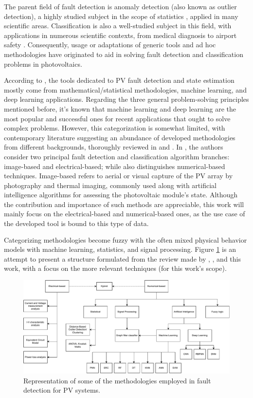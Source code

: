 The parent field of fault detection is anomaly detection (also known as outlier detection), a highly studied subject in the scope of statistics \cite{Prasad2009}, applied in many scientific areas. Classification is also a well-studied subject in this field, with applications in numerous scientific contexts, from medical diagnosis to airport safety \cite{classification}. Consequently, usage or adaptations of generic tools and ad hoc methodologies have originated to aid in solving fault detection and classification problems in photovoltaics.

According to \cite{AIPV}, the tools dedicated to PV fault detection and state estimation mostly come from mathematical/statistical methodologies, machine learning, and deep learning applications. Regarding the three general problem-solving principles mentioned before, it's known that machine learning and deep learning are the most popular and successful ones for recent applications that ought to solve complex problems. However, this categorization is somewhat limited, with contemporary literature suggesting an abundance of developed methodologies from different backgrounds, thoroughly reviewed in \cite{Hong2022} and \cite{Livera2019}. In \cite{Hong2022}, the authors consider two principal fault detection and classification algorithm branches: image-based and electrical-based; while \cite{Livera2019} also distinguishes numerical-based techniques. Image-based refers to aerial or visual capture of the PV array by photography and thermal imaging, commonly used along with artificial intelligence algorithms for assessing the photovoltaic module's state. Although the contribution and importance of such methods are appreciable, this work will mainly focus on the electrical-based and numerical-based ones, as the use case of the developed tool is bound to this type of data.

Categorizing methodologies become fuzzy with the often mixed physical behavior models with machine learning, statistics, and signal processing. Figure \ref{fig:techniques} is an attempt to present a structure formulated from the review made by \cite{Hong2022}, \cite{Livera2019}, and this work, with a focus on the more relevant techniques (for this work's scope).

\begin{figure}[H]
    \centering
    \includegraphics[width=14cm]{figures/chapter2/techniques.drawio.pdf} \caption{Representation of some of the methodologies employed in fault detection for PV systems.}
    \label{fig:techniques}
\end{figure}

